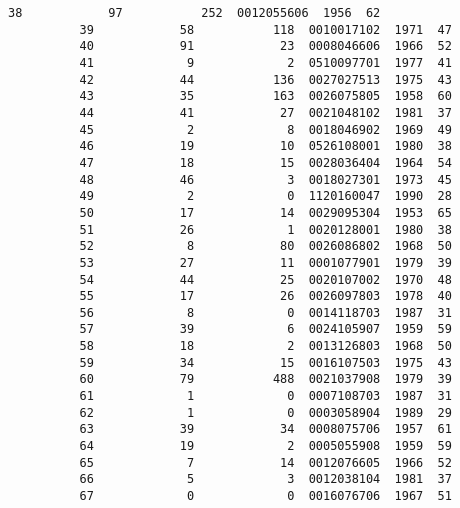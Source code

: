 \documentclass[11pt]{article}
\begin{document}
\begin{Verbatim}[commandchars=\\\{\}]
          38            97           252  0012055606  1956  62  
          39            58           118  0010017102  1971  47  
          40            91            23  0008046606  1966  52  
          41             9             2  0510097701  1977  41  
          42            44           136  0027027513  1975  43  
          43            35           163  0026075805  1958  60  
          44            41            27  0021048102  1981  37  
          45             2             8  0018046902  1969  49  
          46            19            10  0526108001  1980  38  
          47            18            15  0028036404  1964  54  
          48            46             3  0018027301  1973  45  
          49             2             0  1120160047  1990  28  
          50            17            14  0029095304  1953  65  
          51            26             1  0020128001  1980  38  
          52             8            80  0026086802  1968  50  
          53            27            11  0001077901  1979  39  
          54            44            25  0020107002  1970  48  
          55            17            26  0026097803  1978  40  
          56             8             0  0014118703  1987  31  
          57            39             6  0024105907  1959  59  
          58            18             2  0013126803  1968  50  
          59            34            15  0016107503  1975  43  
          60            79           488  0021037908  1979  39  
          61             1             0  0007108703  1987  31  
          62             1             0  0003058904  1989  29  
          63            39            34  0008075706  1957  61  
          64            19             2  0005055908  1959  59  
          65             7            14  0012076605  1966  52  
          66             5             3  0012038104  1981  37  
          67             0             0  0016076706  1967  51  
\end{Verbatim}
        
\end{document}
